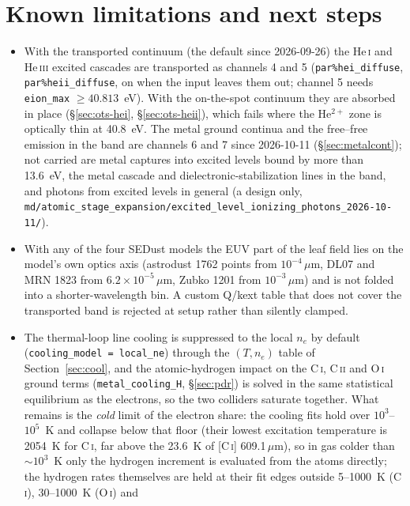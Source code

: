\documentclass[english,a4paper]{my_memo}
\newcommand{\code}[1]{\texttt{#1}}
\begin{document}
\section{Known limitations and next steps}
\label{sec:limits}
\begin{itemize}
\item With the transported continuum (the default since 2026-09-26) the
  He\,\textsc{i} and He\,\textsc{iii} excited cascades are transported as
  channels 4 and 5 (\code{par\%hei\_diffuse}, \code{par\%heii\_diffuse},
  on when the input leaves them out; channel 5 needs \code{eion\_max}
  $\ge 40.813$~eV).  With the on-the-spot continuum they are absorbed in
  place (\S\ref{sec:ots-hei}, \S\ref{sec:ots-heii}), which fails where the
  He$^{2+}$ zone is optically thin at 40.8~eV.  The metal ground continua
  and the free--free emission in the band are channels 6 and 7 since
  2026-10-11 (\S\ref{sec:metalcont}); not carried are metal captures into
  excited levels bound by more than 13.6~eV, the metal cascade and
  dielectronic-stabilization lines in the band, and photons from excited
  levels in general (a design only,
  \code{md/atomic\_stage\_expansion/excited\_level\_ionizing\_photons\_2026-10-11/}).
\item With any of the four SEDust models the EUV part of the leaf field
  lies on the model's own optics axis (astrodust 1762 points from
  $10^{-4}\,\mu$m, DL07 and MRN 1823 from $6.2{\times}10^{-5}\,\mu$m, Zubko
  1201 from $10^{-3}\,\mu$m) and is not folded into a shorter-wavelength
  bin.  A custom Q/kext table that does not cover the
  transported band is rejected at setup rather than silently clamped.
\item The thermal-loop line cooling is suppressed to the local $n_e$ by
  default (\code{cooling\_model = local\_ne}) through the $(T,n_e)$ table
  of Section~\ref{sec:cool}, and the atomic-hydrogen impact on the
  C\,\textsc{i}, C\,\textsc{ii} and O\,\textsc{i} ground terms
  (\code{metal\_cooling\_H}, \S\ref{sec:pdr}) is solved in the same
  statistical equilibrium as the electrons, so the two colliders saturate
  together.  What remains is the \emph{cold} limit of the electron share:
  the cooling fits hold over $10^3$--$10^5$~K and collapse below that floor
  (their lowest excitation temperature is 2054~K for C\,\textsc{i}, far
  above the 23.6~K of [C\,\textsc{i}] 609.1\,$\mu$m), so in gas colder than
  $\sim$$10^3$~K only the hydrogen increment is evaluated from the atoms
  directly; the hydrogen rates themselves are held at their fit edges
  outside 5--1000~K (C\,\textsc{i}), 30--1000~K (O\,\textsc{i}) and
$$
\end{itemize}
\end{document}
